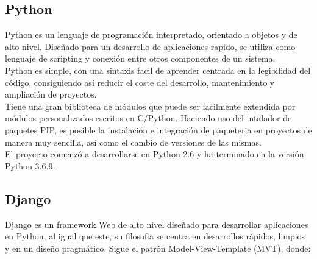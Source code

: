 \documentclass[11pt,a4paper]{book}
\begin{document}
			\subsection{Python}
				Python es un lenguaje de programación interpretado, orientado a objetos y de alto nivel. Diseñado para un desarrollo de aplicaciones rapido, se utiliza como lenguaje de scripting y conexión entre otros componentes de un sistema.\\
				
				
				Python es simple, con una sintaxis facil de aprender centrada en la legibilidad del código, consiguiendo así reducir el coste del desarrollo, mantenimiento y ampliación de proyectos.\\
				
				
				Tiene una gran biblioteca de módulos que puede ser facilmente extendida por módulos personalizados escritos en C/Python. Haciendo uso del intalador de paquetes PIP, es posible la instalación e integración de paqueteria en proyectos de manera muy sencilla, así como el cambio de versiones de las mismas.\\
				
				El proyecto comenzó a desarrollarse en Python 2.6 y ha terminado en la versión Python 3.6.9.
				
				
			\subsection{Django}
				Django es un framework Web de alto nivel diseñado para desarrollar aplicaciones en Python, al igual que este, su filosofia se centra en desarrollos rápidos, limpios y en un diseño pragmático.
				Sigue el patrón Model-View-Template (MVT), donde:\\
				
\end{document}
